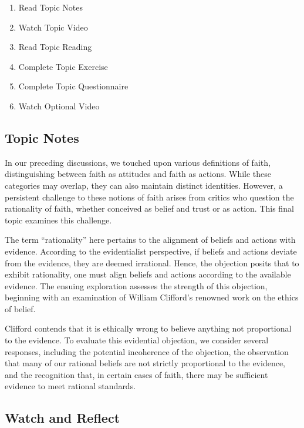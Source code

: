 \documentclass[
]{book}
\providecommand{\tightlist}{%
  \setlength{\itemsep}{0pt}\setlength{\parskip}{0pt}}
\begin{document}
\begin{enumerate}
\def\labelenumi{\arabic{enumi}.}
\tightlist
\item
  Read Topic Notes
\item
  Watch Topic Video
\item
  Read Topic Reading
\item
  Complete Topic Exercise
\item
  Complete Topic Questionnaire
\item
  Watch Optional Video
\end{enumerate}

\hypertarget{topic-notes-7}{%
\subsection*{Topic Notes}\label{topic-notes-7}}

In our preceding discussions, we touched upon various definitions of faith, distinguishing between faith as attitudes and faith as actions. While these categories may overlap, they can also maintain distinct identities. However, a persistent challenge to these notions of faith arises from critics who question the rationality of faith, whether conceived as belief and trust or as action. This final topic examines this challenge.

The term ``rationality'' here pertains to the alignment of beliefs and actions with evidence. According to the evidentialist perspective, if beliefs and actions deviate from the evidence, they are deemed irrational. Hence, the objection posits that to exhibit rationality, one must align beliefs and actions according to the available evidence. The ensuing exploration assesses the strength of this objection, beginning with an examination of William Clifford's renowned work on the ethics of belief.

Clifford contends that it is ethically wrong to believe anything not proportional to the evidence. To evaluate this evidential objection, we consider several responses, including the potential incoherence of the objection, the observation that many of our rational beliefs are not strictly proportional to the evidence, and the recognition that, in certain cases of faith, there may be sufficient evidence to meet rational standards.

\hypertarget{watch-and-reflect-14}{%
\subsection*{Watch and Reflect}\label{watch-and-reflect-14}}
\end{document}
